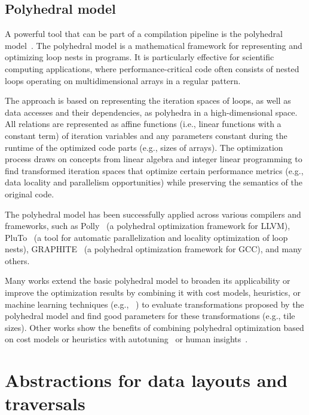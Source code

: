\subsection{Polyhedral model}\label{sec:polyhedral-model}

A powerful tool that can be part of a compilation pipeline is the polyhedral model~\cite{feautrier1992some}. The polyhedral model is a mathematical framework for representing and optimizing loop nests in programs. It is particularly effective for scientific computing applications, where performance-critical code often consists of nested loops operating on multidimensional arrays in a regular pattern.

The approach is based on representing the iteration spaces of loops, as well as data accesses and their dependencies, as polyhedra in a high-dimensional space. All relations are represented as affine functions (i.e., linear functions with a constant term) of iteration variables and any parameters constant during the runtime of the optimized code parts (e.g., sizes of arrays). The optimization process draws on concepts from linear algebra and integer linear programming to find transformed iteration spaces that optimize certain performance metrics (e.g., data locality and parallelism opportunities) while preserving the semantics of the original code.

The polyhedral model has been successfully applied across various compilers and frameworks, such as Polly~\cite{grosser2012polly} (a polyhedral optimization framework for LLVM), PluTo~\cite{bondhugula2008pluto} (a tool for automatic parallelization and locality optimization of loop nests), GRAPHITE~\cite{trifunovic2010graphite} (a polyhedral optimization framework for GCC), and many others.

Many works extend the basic polyhedral model to broaden its applicability or improve the optimization results by combining it with cost models, heuristics, or machine learning techniques (e.g., \citeauthor{baghdadi2021deep}~\cite{baghdadi2021deep}) to evaluate transformations proposed by the polyhedral model and find good parameters for these transformations (e.g., tile sizes). Other works show the benefits of combining polyhedral optimization based on cost models or heuristics with autotuning~\cite{chelini2020automatic} or human insights~\cite{zinenko2014clint,bagneres2016opening}.


\section{Abstractions for data layouts and traversals}\label{sec:abstractions}

